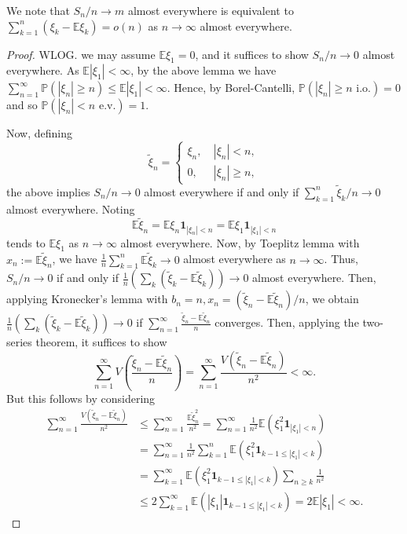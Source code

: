 \documentclass[]{article}
\theoremstyle{definition}
\theoremstyle{definition}
\begin{document}
We note that \(S_n / n \to m\) almost everywhere is equivalent to 
\(\sum_{k = 1}^n (\xi_k - \mathbb{E}\xi_k) = o(n)\) as \(n \to \infty\) almost 
everywhere.

\begin{proof}
  WLOG. we may assume \(\mathbb{E}\xi_1 = 0\), and it suffices to show 
  \(S_n / n \to 0\) almost everywhere. As 
  \(\mathbb{E}|\xi_1|<\infty\), by the above lemma we have  
  \(\sum_{n = 1}^\infty \mathbb{P}(|\xi_n| \ge n) \le \mathbb{E}|\xi_1| < \infty\). 
  Hence, by Borel-Cantelli, \(\mathbb{P}(|\xi_n| \ge n \text{ i.o.}) = 0\) 
  and so \(\mathbb{P}(|\xi_n| < n \text{ e.v.}) = 1\).

  Now, defining 
  \[\tilde \xi_n = \begin{cases}
    \xi_n, & \ |\xi_n| < n,\\
    0, & \ |\xi_n| \ge n,
  \end{cases}\]
  the above implies \(S_n / n \to 0\) almost everywhere if and only if 
  \(\sum_{k = 1}^n \tilde \xi_k / n \to 0\) almost everywhere. Noting 
  \[\mathbb{E}\tilde \xi_n = \mathbb{E} \xi_n \mathbf{1}_{|\xi_n| < n} = 
    \mathbb{E}\xi_1 \mathbf{1}_{|\xi_1| < n}\]
  tends to \(\mathbb{E}\xi_1\) as \(n \to \infty\) almost everywhere. Now, 
  by Toeplitz lemma with \(x_n := \mathbb{E}\tilde \xi_n\), we have 
  \(\frac{1}{n} \sum_{k = 1}^n \mathbb{E}\tilde \xi_k \to 0\)
  almost everywhere as \(n \to \infty\). Thus, \(S_n / n \to 0\) 
  if and only if \(\frac{1}{n}(\sum_k (\tilde \xi_k - \mathbb{E} \tilde \xi_k))
  \to 0\) almost everywhere. Then, applying Kronecker's lemma with 
  \(b_n = n, x_n = (\tilde \xi_n - \mathbb{E} \tilde \xi_n) / n\), we obtain
  \(\frac{1}{n}(\sum_k (\tilde \xi_k - \mathbb{E} \tilde \xi_k)) \to 0\) if 
  \(\sum_{n = 1}^\infty \frac{\tilde \xi_n - \mathbb{E}\tilde \xi_n}{n}\) 
  converges. Then, applying the two-series theorem, it suffices to show 
  \[\sum_{n = 1}^\infty V\left(\frac{\tilde \xi_n - \mathbb{E}\tilde \xi_n}{n}\right)
    = \sum_{n = 1}^\infty \frac{V(\tilde \xi_n - \mathbb{E}\tilde \xi_n)}{n^2} < \infty.\]
  But this follows by considering 
  \[\begin{split}
    \sum_{n = 1}^\infty \frac{V(\tilde \xi_n  - \mathbb{E}\tilde \xi_n)}{n^2}
    & \le \sum_{n = 1}^\infty \frac{\mathbb{E}\tilde \xi_n^2}{n^2} = 
    \sum_{n = 1}^\infty \frac{1}{n^2}\mathbb{E}(\xi_1^2 \mathbf{1}_{|\xi_1| < n})\\
    & = \sum_{n = 1}^\infty \frac{1}{n^2}
      \sum_{k = 1}^n\mathbb{E}(\xi_1^2 \mathbf{1}_{k - 1\le |\xi_1| < k})\\
    & = \sum_{k = 1}^\infty
      \mathbb{E}(\xi_1^2 \mathbf{1}_{k - 1\le |\xi_1| < k})
      \sum_{n \ge k} \frac{1}{n^2}\\
    & \le 2 \sum_{k = 1}^\infty \mathbb{E}(|\xi_1|\mathbf{1}_{k - 1 \le |\xi_1| < k})
      = 2 \mathbb{E}|\xi_1| < \infty.
  \end{split}\]
\end{proof}
\end{document}
